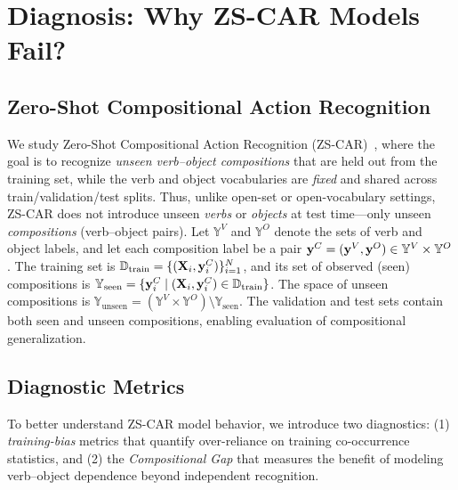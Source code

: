  \section{Diagnosis: Why ZS-CAR Models Fail?}
\label{sec:preliminaries}


\subsection{Zero-Shot Compositional Action Recognition}

We study Zero-Shot Compositional Action Recognition (ZS-CAR)~\cite{li2024c2c}, where the goal is to recognize \emph{unseen verb--object compositions} that are held out from the training set, while the verb and object vocabularies are \emph{fixed} and shared across train/validation/test splits.
Thus, unlike open-set or open-vocabulary settings, ZS-CAR does not introduce unseen \emph{verbs} or \emph{objects} at test time---only unseen \emph{compositions} (verb--object pairs).
Let $\mathbb{Y}^V$ and $\mathbb{Y}^O$ denote the sets of verb and object labels, and let each composition label be a pair $\mathbf{y}^C=(\mathbf{y}^V,\mathbf{y}^O) \in \mathbb{Y}^V \times \mathbb{Y}^O$.
The training set is $\mathbb{D}_{\text{train}}=\{(\mathbf{X}_i,\mathbf{y}^C_i)\}_{i=1}^N$, and its set of observed (seen) compositions is
$\mathbb{Y}_{\text{seen}}=\{\mathbf{y}^C_i \mid (\mathbf{X}_i,\mathbf{y}^C_i)\in\mathbb{D}_{\text{train}}\}$.
The space of unseen compositions is
$\mathbb{Y}_{\text{unseen}} = (\mathbb{Y}^V \times \mathbb{Y}^O)\setminus \mathbb{Y}_{\text{seen}}$.
The validation and test sets contain both seen and unseen compositions, enabling evaluation of compositional generalization.  



\subsection{Diagnostic Metrics}

To better understand ZS-CAR model behavior, we introduce two diagnostics:
(1) \emph{training-bias} metrics that quantify over-reliance on training co-occurrence statistics, and
(2) the \emph{Compositional Gap} that measures the benefit of modeling verb--object dependence beyond independent recognition.




